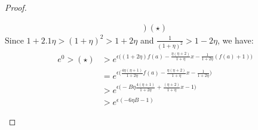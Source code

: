 \documentclass[a4paper,11pt]{article}
\begin{document}
\begin{proof}
\begin{itemize}
\[\begin{array}{ll}
{		\bigg)} ~ (\star)
		\end{array}
		\]
		Since $ 1 + 2.1\eta > (1 + \eta)^2 > 1 + 2\eta$ and $\frac{1}{(1 + \eta)^2} > 1 - 2 \eta$, we have:
		\[
		\begin{array}{ll}
		e^0 > (\star) & > e^{\epsilon \big(
		(1 + 2\eta) f(a) - \frac{\eta(\eta + 2)}{1 + \eta} x
		- \frac{1}{1 + 2\eta}(f(a) + 1)
		\big)}\\
		& = e^{\epsilon\big(
		\frac{4\eta(\eta + 1)}{1 + 2\eta} f(a) 
		- \frac{\eta(\eta + 2)}{1 + \eta} x
		- \frac{1}{1 + 2\eta}		
		\big)}\\
		& > e^{\epsilon\big( -B \eta
		\frac{4(\eta + 1)}{1 + 2\eta} + \frac{(\eta + 2)}{1 + \eta} x - 1	
		\big)}\\
%
		& > e^{\epsilon(-6 \eta B - 1)}
		\end{array}
		\]
	\end{itemize}



\end{proof}




\newpage


\end{document}
